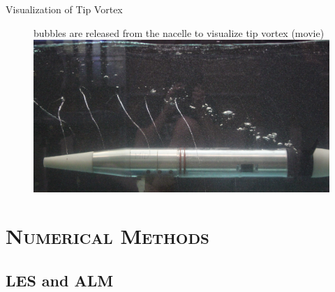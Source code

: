 \documentclass[xcolor=x11names,compress]{beamer}
\renewcommand{\(}{\begin{columns}}
\renewcommand{\)}{\end{columns}}
\newcommand{\<}[1]{\begin{column}{#1}}
\renewcommand{\>}{\end{column}}
\begin{document}
	\begin{frame}{Visualization of Tip Vortex}

		\begin{figure}[p]
		    \item bubbles are released from the nacelle to visualize tip vortex (movie)
		    \centering
		    \includegraphics[width=1.0\textwidth]{figures/turbine_tip_vortex_and_bubbles.png}
		    \label{fig:tip-vortex-and-bubbles}
		\end{figure}


	\end{frame}

\section{\scshape Numerical Methods}

\subsection{LES and ALM}
\end{document}

